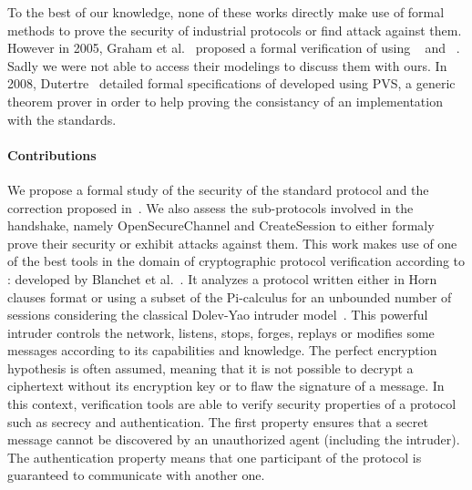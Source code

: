 To the best of our knowledge, none of these works directly make use of formal
methods to prove the security of industrial protocols or find attack against
them.
However in 2005, Graham et al.~\cite{GP05} proposed a formal verification of
\dnp using \ofmc~\cite{BMV03} and \spear~\cite{SH01}.
\TODO Sadly we were not able to access their modelings to discuss them with
ours.
In 2008, Dutertre~\cite{Dut08} detailed formal specifications of \modbus
developed using PVS, a generic theorem prover in order to help proving the
consistancy of an implementation with the standards.

\paragraph{Contributions}

We propose a formal study of the security of the standard \modbus protocol and
the correction proposed in~\cite{FCMT09}.%
We also assess the sub-protocols involved in the \opcua handshake, namely \opcua
OpenSecureChannel and \opcua CreateSession to either formaly prove their
security or exhibit attacks against them.
This work makes use of one of the best tools in the domain of cryptographic
protocol verification according to \cite{LP15}: \proverif developed by Blanchet
et al.~\cite{Bla01}.
It analyzes a protocol written either in Horn clauses format or using a subset
of the Pi-calculus for an unbounded number of sessions considering the
classical Dolev-Yao intruder model~\cite{DY81}.
This powerful intruder controls the network, listens, stops, forges, replays or
modifies some messages according to its capabilities and knowledge.
The perfect encryption hypothesis is often assumed, meaning that it is not
possible to decrypt a ciphertext without its encryption key or to flaw
the signature of a message.
In this context, verification tools are able to verify security properties
of a protocol such as secrecy and authentication.
The first property ensures that a secret message cannot be discovered by an
unauthorized agent (including the intruder).
The authentication property means that one participant of the protocol is
guaranteed to communicate with another one.
